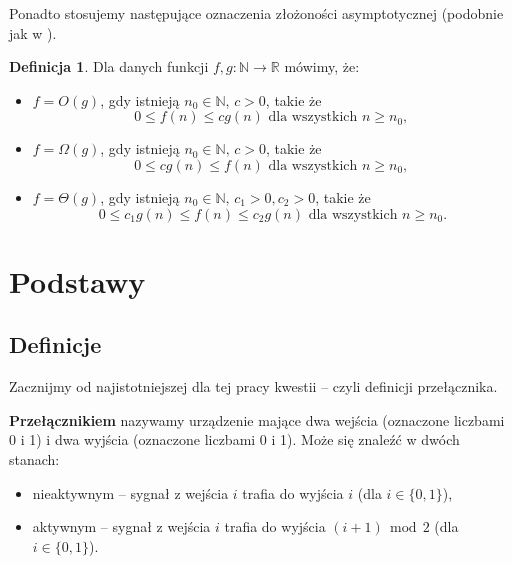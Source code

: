 \documentclass[a4paper]{article}
\renewcommand{\mod}{\, \operatorname{mod} \,}
\newcommand{\td}{\text{.}}
\newcommand{\tc}{\text{, }}
\newcommand{\N}{\mathbb{N}}
\newcommand{\R}{\mathbb{R}}
\theoremstyle{definition}
\newtheorem{df}[tw]{Definicja}
\begin{document}
Ponadto stosujemy następujące oznaczenia złożoności asymptotycznej (podobnie jak w \cite{cormen}).

\begin{df}
    Dla danych funkcji \(f, g : \N \to \R\) mówimy, że:
    \begin{itemize}
        \item \(f = O(g)\), gdy istnieją \( n_0 \in \N, \,  c > 0\), takie że 
        \[
            0 \leq f(n) \leq cg(n)  \text{ dla wszystkich } n \geq n_0 \tc
        \]
        \item \(f = \Omega(g)\), gdy istnieją \( n_0 \in \N, \,  c > 0\), takie że 
        \[
            0 \leq cg(n) \leq f(n)  \text{ dla wszystkich } n \geq n_0 \tc
        \]
        \item  \(f = \Theta(g)\), gdy istnieją \( n_0 \in \N, \,  c_1 > 0, c_2 > 0\), takie że 
        \[
            0 \leq c_1 g(n) \leq f(n) \leq c_2 g(n)  \text{ dla wszystkich } n \geq n_0 \td
        \]
    \end{itemize}
\end{df}



\section{Podstawy}

\subsection{Definicje}

Zacznijmy od najistotniejszej dla tej pracy kwestii -- czyli definicji przełącznika.

\vspace{1em}

{\bf Przełącznikiem} nazywamy urządzenie mające dwa wejścia (oznaczone liczbami 0 i 1)  i dwa wyjścia (oznaczone liczbami 0 i 1). Może się znaleźć w dwóch stanach:

\begin{itemize}
    \item nieaktywnym -- sygnał z wejścia \(i\) trafia do wyjścia \(i\) (dla \(i \in \{0,1\}\)),
    \item  aktywnym -- sygnał z wejścia \(i\) trafia do wyjścia \((i+1) \mod 2\) (dla \(i \in \{0,1\}\)).
\end{itemize}
\end{document}

